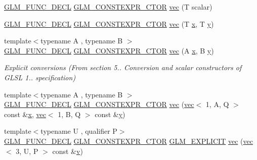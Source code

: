 \begin{DoxyCompactItemize}
\item 
\hyperlink{setup_8hpp_ab2d052de21a70539923e9bcbf6e83a51}{G\+L\+M\+\_\+\+F\+U\+N\+C\+\_\+\+D\+E\+CL} \hyperlink{setup_8hpp_ad34178a09666081abdb573c14d1f4a5a}{G\+L\+M\+\_\+\+C\+O\+N\+S\+T\+E\+X\+P\+R\+\_\+\+C\+T\+OR} \hyperlink{structglm_1_1vec_3_012_00_01_t_00_01_q_01_4_a638fde20902e4e7546f71dfad919a17f}{vec} (T scalar)
\item 
\hyperlink{setup_8hpp_ab2d052de21a70539923e9bcbf6e83a51}{G\+L\+M\+\_\+\+F\+U\+N\+C\+\_\+\+D\+E\+CL} \hyperlink{setup_8hpp_ad34178a09666081abdb573c14d1f4a5a}{G\+L\+M\+\_\+\+C\+O\+N\+S\+T\+E\+X\+P\+R\+\_\+\+C\+T\+OR} \hyperlink{structglm_1_1vec_3_012_00_01_t_00_01_q_01_4_a283bdd9caea39778ed8ff4717b904718}{vec} (T \hyperlink{_s_d_l__opengl_8h_ad0e63d0edcdbd3d79554076bf309fd47}{x}, T \hyperlink{_s_d_l__opengl_8h_a1675d9d7bb68e1657ff028643b4037e3}{y})
\item 
{\footnotesize template$<$typename A , typename B $>$ }\\\hyperlink{setup_8hpp_ab2d052de21a70539923e9bcbf6e83a51}{G\+L\+M\+\_\+\+F\+U\+N\+C\+\_\+\+D\+E\+CL} \hyperlink{setup_8hpp_ad34178a09666081abdb573c14d1f4a5a}{G\+L\+M\+\_\+\+C\+O\+N\+S\+T\+E\+X\+P\+R\+\_\+\+C\+T\+OR} \hyperlink{structglm_1_1vec_3_012_00_01_t_00_01_q_01_4_abea96c6b6d58c8388feaebb73af0cb68}{vec} (A \hyperlink{_s_d_l__opengl_8h_ad0e63d0edcdbd3d79554076bf309fd47}{x}, B \hyperlink{_s_d_l__opengl_8h_a1675d9d7bb68e1657ff028643b4037e3}{y})
\begin{DoxyCompactList}\small\item\em Explicit conversions (From section 5.. Conversion and scalar constructors of G\+L\+SL 1.. specification) \end{DoxyCompactList}\item 
{\footnotesize template$<$typename A , typename B $>$ }\\\hyperlink{setup_8hpp_ab2d052de21a70539923e9bcbf6e83a51}{G\+L\+M\+\_\+\+F\+U\+N\+C\+\_\+\+D\+E\+CL} \hyperlink{setup_8hpp_ad34178a09666081abdb573c14d1f4a5a}{G\+L\+M\+\_\+\+C\+O\+N\+S\+T\+E\+X\+P\+R\+\_\+\+C\+T\+OR} \hyperlink{structglm_1_1vec_3_012_00_01_t_00_01_q_01_4_a72065648c117a667a7f06353b880a0aa}{vec} (\hyperlink{structglm_1_1vec}{vec}$<$ 1, A, Q $>$ const \&\hyperlink{_s_d_l__opengl_8h_ad0e63d0edcdbd3d79554076bf309fd47}{x}, \hyperlink{structglm_1_1vec}{vec}$<$ 1, B, Q $>$ const \&\hyperlink{_s_d_l__opengl_8h_a1675d9d7bb68e1657ff028643b4037e3}{y})
\item 
{\footnotesize template$<$typename U , qualifier P$>$ }\\\hyperlink{setup_8hpp_ab2d052de21a70539923e9bcbf6e83a51}{G\+L\+M\+\_\+\+F\+U\+N\+C\+\_\+\+D\+E\+CL} \hyperlink{setup_8hpp_ad34178a09666081abdb573c14d1f4a5a}{G\+L\+M\+\_\+\+C\+O\+N\+S\+T\+E\+X\+P\+R\+\_\+\+C\+T\+OR} \hyperlink{setup_8hpp_a6c74f5a5e7b134ab69023ff9a30d4d5d}{G\+L\+M\+\_\+\+E\+X\+P\+L\+I\+C\+IT} \hyperlink{structglm_1_1vec_3_012_00_01_t_00_01_q_01_4_a5b7cfdc305cd9c9cbedd6bdb8348e48c}{vec} (\hyperlink{structglm_1_1vec}{vec}$<$ 3, U, P $>$ const \&\hyperlink{_s_d_l__opengl_8h_a10a82eabcb59d2fcd74acee063775f90}{v})

\end{DoxyCompactItemize}
